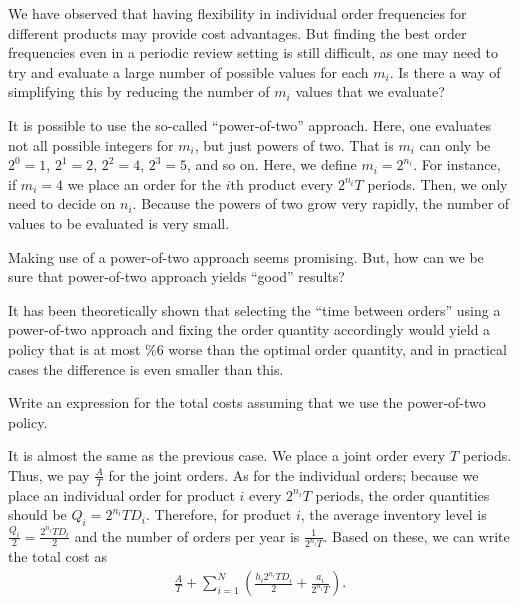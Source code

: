 \begin{exercise}
We have observed that having flexibility in individual order frequencies for different products may provide cost advantages. But finding the best order frequencies even in a periodic review setting is still difficult, as one may need to try and evaluate a large number of possible values for each $m_i$. Is there a way of simplifying this by reducing the number of $m_i$ values that we evaluate?


\begin{solution}
It is possible to use the so-called ``power-of-two'' approach. Here, one evaluates not all possible integers for $m_i$, but just powers of two. That is $m_i$ can only be $2^0=1$, $2^1=2$, $2^2=4$, $2^3=5$, and so on. Here, we define $m_i=2^{n_i}$. For instance, if $m_i=4$ we place an order for the $i$th product every $2^{n_i}T$ periods. Then, we only need to decide on $n_i$. Because the powers of two grow very rapidly, the number of values to be evaluated is very small.
\end{solution}
\end{exercise}

\begin{exercise}
Making use of a power-of-two approach seems promising. But, how can we be sure that power-of-two approach yields ``good'' results?


\begin{solution}
It has been theoretically shown that selecting the ``time between orders'' using a power-of-two approach and fixing the order quantity accordingly would yield a policy that is at most \%6 worse than the optimal order quantity, and in practical cases the difference is even smaller than this. 
\end{solution}
\end{exercise}

\begin{exercise}
Write an expression for the total costs assuming that we use the power-of-two policy.


\begin{solution}
It is almost the same as the previous case. We place a joint order every $T$ periods. Thus, we pay $\frac{A}{T}$ for the joint orders. As for the individual orders; because  we place an individual order for product $i$ every $2^{n_i} T$ periods, the order quantities should be $Q_i = 2^{n_i} T D_i$. Therefore, for product $i$, the average inventory level is $\frac{Q_i}{2}=\frac{2^{n_i} T D_i}{2}$ and the number of orders per year is $\frac{1}{2^{n_i} T}$. Based on these, we can write the total cost as
\begin{align*}
\frac{A}{T} + \sum_{i=1}^N \left(\frac{h_i 2^{n_i} T D_i}{2} + \frac{a_i}{2^{n_i} T}\right).
\end{align*}
\end{solution}
\end{exercise}


